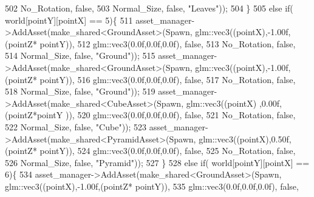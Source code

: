 \begin{DoxyCode}
502                                                              No\_Rotation, \textcolor{keyword}{false},
503                                                              Normal\_Size, \textcolor{keyword}{false}, \textcolor{stringliteral}{"Leaves"}));
504    \}
505     \textcolor{keywordflow}{else} \textcolor{keywordflow}{if}( world[pointY][pointX] == 5)\{
511             asset\_manager->AddAsset(make\_shared<GroundAsset>(Spawn, glm::vec3((pointX),-1.00f,(pointZ*
      pointY)),
512                                                              glm::vec3(0.0f,0.0f,0.0f), \textcolor{keyword}{false},
513                                                              No\_Rotation, \textcolor{keyword}{false},
514                                                              Normal\_Size, \textcolor{keyword}{false}, \textcolor{stringliteral}{"Ground"}));
515             asset\_manager->AddAsset(make\_shared<GroundAsset>(Spawn, glm::vec3((pointX),-1.00f,(pointZ*
      pointY)),
516                                                              glm::vec3(0.0f,0.0f,0.0f), \textcolor{keyword}{false},
517                                                              No\_Rotation, \textcolor{keyword}{false},
518                                                              Normal\_Size, \textcolor{keyword}{false}, \textcolor{stringliteral}{"Ground"}));
519             asset\_manager->AddAsset(make\_shared<CubeAsset>(Spawn, glm::vec3((pointX)  ,0.00f,(pointZ*pointY
      )), 
520                                                            glm::vec3(0.0f,0.0f,0.0f), \textcolor{keyword}{false},
521                                                            No\_Rotation, \textcolor{keyword}{false},
522                                                            Normal\_Size, \textcolor{keyword}{false}, \textcolor{stringliteral}{"Cube"}));
523             asset\_manager->AddAsset(make\_shared<PyramidAsset>(Spawn, glm::vec3((pointX),0.50f,(pointZ*
      pointY)),
524                                                               glm::vec3(0.0f,0.0f,0.0f), \textcolor{keyword}{false},
525                                                               No\_Rotation, \textcolor{keyword}{false},
526                                                               Normal\_Size, \textcolor{keyword}{false}, \textcolor{stringliteral}{"Pyramid"}));
527    \}
528     \textcolor{keywordflow}{else} \textcolor{keywordflow}{if}( world[pointY][pointX] == 6)\{
534             asset\_manager->AddAsset(make\_shared<GroundAsset>(Spawn, glm::vec3((pointX),-1.00f,(pointZ*
      pointY)),
535                                                              glm::vec3(0.0f,0.0f,0.0f), \textcolor{keyword}{false},

\end{DoxyCode}
